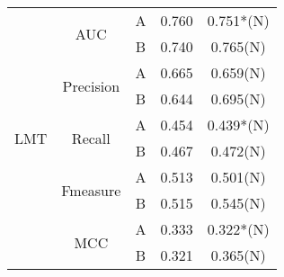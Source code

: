 \begin{table}[t!]
{\begin{tabular}{|c|c|c|c|c|}
\multirow{10}{*}{LMT} & \multirow{2}{*}{AUC}       & A & 0.760  & 0.751*(N)                  \\ \cline{3-5} 
                      &                            & B & 0.740  & 0.765(N)                   \\ \cline{2-5} 
                      & \multirow{2}{*}{Precision} & A & 0.665 & 0.659(N)                   \\ \cline{3-5} 
                      &                            & B & 0.644 & 0.695(N)                   \\ \cline{2-5} 
                      & \multirow{2}{*}{Recall}    & A & 0.454 & 0.439*(N)                  \\ \cline{3-5} 
                      &                            & B & 0.467 & 0.472(N)                   \\ \cline{2-5} 
                      & \multirow{2}{*}{Fmeasure}  & A & 0.513 & 0.501(N)                   \\ \cline{3-5} 
                      &                            & B & 0.515 & 0.545(N)                   \\ \cline{2-5} 
                      & \multirow{2}{*}{MCC}       & A & 0.333 & 0.322*(N)                  \\ \cline{3-5} 
                      &                            & B & 0.321 & 0.365(N)                   \\ \hline
\end{tabular}%
}
\end{table}